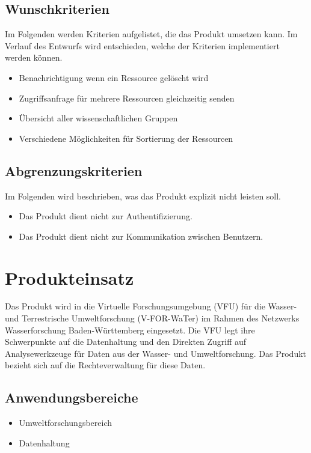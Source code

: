 \documentclass[parskip=full,11pt]{scrartcl}
\begin{document}
\subsection{Wunschkriterien}
Im Folgenden werden Kriterien aufgelistet, die das Produkt umsetzen kann.
Im Verlauf des Entwurfs wird entschieden, welche der Kriterien  implementiert werden können.
\begin{itemize}[itemsep=0pt]
\item Benachrichtigung wenn ein Ressource gelöscht wird
\item Zugriffsanfrage für mehrere Ressourcen gleichzeitig senden
\item Übersicht aller wissenschaftlichen Gruppen
\item Verschiedene Möglichkeiten für Sortierung der Ressourcen
\end{itemize}

\subsection{Abgrenzungskriterien}
Im Folgenden wird beschrieben, was das Produkt explizit nicht leisten soll.
\begin{itemize}[itemsep=0pt]
\item Das Produkt dient nicht zur Authentifizierung.
\item Das Produkt dient nicht zur Kommunikation zwischen Benutzern.
\end{itemize}


\section{Produkteinsatz}
Das Produkt wird in die Virtuelle Forschungsumgebung (VFU) für die Wasser-
und Terrestrische Umweltforschung (V-FOR-WaTer) im Rahmen des Netzwerks
Wasserforschung Baden-Württemberg eingesetzt. Die VFU legt ihre Schwerpunkte
auf die Datenhaltung und den Direkten Zugriff auf Analysewerkzeuge für Daten
aus der Wasser- und Umweltforschung. Das Produkt bezieht sich auf die
Rechteverwaltung für diese Daten.

\subsection{Anwendungsbereiche}
\begin{itemize}[itemsep=0pt]
\item Umweltforschungsbereich
\item Datenhaltung
\end{itemize}
\end{document}
